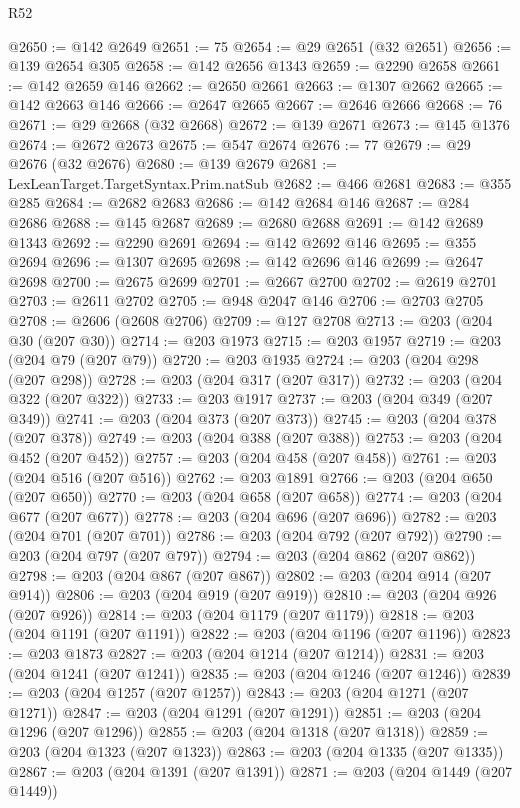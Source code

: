 \begin{lexlean}{R52}
\begin{coremodule}
{{{{{{{{{{{{{{{{{{{{{{{{{{{{{{{{{{{{{{{{{{{{{{{{{{{{{{{{{{{{{{{{{{{{{{{{{{{{{{{{{{{{{{{{{{{{{{{{{{{{{{{{{{{{{{{{{{{{{{{{{{{{{{{{{{{{{{{{{{{{{{{{{{{{{{{{{{{{{{{{{{{{{{{{{{{{{{{{{{{{{{{{{{{{{{{{{{{{{{@2650 := @142 @2649
@2651 := 75
@2654 := @29 @2651 (@32 @2651)
@2656 := @139 @2654 @305
@2658 := @142 @2656 @1343
@2659 := @2290 @2658
@2661 := @142 @2659 @146
@2662 := @2650 @2661
@2663 := @1307 @2662
@2665 := @142 @2663 @146
@2666 := @2647 @2665
@2667 := @2646 @2666
@2668 := 76
@2671 := @29 @2668 (@32 @2668)
@2672 := @139 @2671
@2673 := @145 @1376
@2674 := @2672 @2673
@2675 := @547 @2674
@2676 := 77
@2679 := @29 @2676 (@32 @2676)
@2680 := @139 @2679
@2681 := LexLeanTarget.TargetSyntax.Prim.natSub
@2682 := @466 @2681
@2683 := @355 @285
@2684 := @2682 @2683
@2686 := @142 @2684 @146
@2687 := @284 @2686
@2688 := @145 @2687
@2689 := @2680 @2688
@2691 := @142 @2689 @1343
@2692 := @2290 @2691
@2694 := @142 @2692 @146
@2695 := @355 @2694
@2696 := @1307 @2695
@2698 := @142 @2696 @146
@2699 := @2647 @2698
@2700 := @2675 @2699
@2701 := @2667 @2700
@2702 := @2619 @2701
@2703 := @2611 @2702
@2705 := @948 @2047 @146
@2706 := @2703 @2705
@2708 := @2606 (@2608 @2706)
@2709 := @127 @2708
@2713 := @203 (@204 @30 (@207 @30))
@2714 := @203 @1973
@2715 := @203 @1957
@2719 := @203 (@204 @79 (@207 @79))
@2720 := @203 @1935
@2724 := @203 (@204 @298 (@207 @298))
@2728 := @203 (@204 @317 (@207 @317))
@2732 := @203 (@204 @322 (@207 @322))
@2733 := @203 @1917
@2737 := @203 (@204 @349 (@207 @349))
@2741 := @203 (@204 @373 (@207 @373))
@2745 := @203 (@204 @378 (@207 @378))
@2749 := @203 (@204 @388 (@207 @388))
@2753 := @203 (@204 @452 (@207 @452))
@2757 := @203 (@204 @458 (@207 @458))
@2761 := @203 (@204 @516 (@207 @516))
@2762 := @203 @1891
@2766 := @203 (@204 @650 (@207 @650))
@2770 := @203 (@204 @658 (@207 @658))
@2774 := @203 (@204 @677 (@207 @677))
@2778 := @203 (@204 @696 (@207 @696))
@2782 := @203 (@204 @701 (@207 @701))
@2786 := @203 (@204 @792 (@207 @792))
@2790 := @203 (@204 @797 (@207 @797))
@2794 := @203 (@204 @862 (@207 @862))
@2798 := @203 (@204 @867 (@207 @867))
@2802 := @203 (@204 @914 (@207 @914))
@2806 := @203 (@204 @919 (@207 @919))
@2810 := @203 (@204 @926 (@207 @926))
@2814 := @203 (@204 @1179 (@207 @1179))
@2818 := @203 (@204 @1191 (@207 @1191))
@2822 := @203 (@204 @1196 (@207 @1196))
@2823 := @203 @1873
@2827 := @203 (@204 @1214 (@207 @1214))
@2831 := @203 (@204 @1241 (@207 @1241))
@2835 := @203 (@204 @1246 (@207 @1246))
@2839 := @203 (@204 @1257 (@207 @1257))
@2843 := @203 (@204 @1271 (@207 @1271))
@2847 := @203 (@204 @1291 (@207 @1291))
@2851 := @203 (@204 @1296 (@207 @1296))
@2855 := @203 (@204 @1318 (@207 @1318))
@2859 := @203 (@204 @1323 (@207 @1323))
@2863 := @203 (@204 @1335 (@207 @1335))
@2867 := @203 (@204 @1391 (@207 @1391))
@2871 := @203 (@204 @1449 (@207 @1449))
}}}}}}}}}}}}}}}}}}}}}}}}}}}}}}}}}}}}}}}}}}}}}}}}}}}}}}}}}}}}}}}}}}}}}}}}}}}}}}}}}}}}}}}}}}}}}}}}}}}}}}}}}}}}}}}}}}}}}}}}}}}}}}}}}}}}}}}}}}}}}}}}}}}}}}}}}}}}}}}}}}}}}}}}}}}}}}}}}}}}}}}}}}}}}}}}}}}}}}
\end{coremodule}
\end{lexlean}
